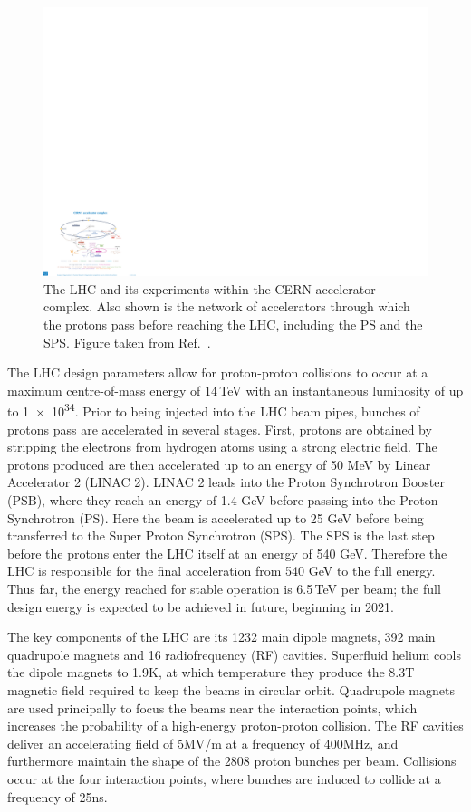 \begin{figure}[h!]
  \centering
  \includegraphics[width=\textwidth]{Figures/Detector/CERNschematic.pdf}
  \caption[The CERN accelerator complex.]
  {
    The LHC and its experiments within the CERN accelerator complex.
    Also shown is the network of accelerators through which the protons pass before reaching the LHC, 
    including the PS and the SPS.
    Figure taken from Ref.~\cite{CERNcomplex}.
  }
  \label{fig:detector_CERNschematic}
\end{figure}

The LHC design parameters allow for proton-proton collisions to occur at a maximum centre-of-mass energy of 14\,TeV 
with an instantaneous luminosity of up to \SI{1e34}{\lumi}.
Prior to being injected into the LHC beam pipes, bunches of protons pass are accelerated in several stages. 
First, protons are obtained by stripping the electrons from hydrogen atoms using a strong electric field.
The protons produced are then accelerated up to an energy of 50 MeV by Linear Accelerator 2 (LINAC 2).
LINAC 2 leads into the Proton Synchrotron Booster (PSB), where they reach an energy of 1.4 GeV before passing into the Proton Synchrotron (PS).
Here the beam is accelerated up to 25 GeV before being transferred to the Super Proton Synchrotron (SPS).
The SPS is the last step before the protons enter the LHC itself at an energy of 540 GeV.
Therefore the LHC is responsible for the final acceleration from 540 GeV to the full energy.
Thus far, the energy reached for stable operation is 6.5\,TeV per beam; 
the full design energy is expected to be achieved in future, beginning in 2021.

The key components of the LHC are its 1232 main dipole magnets, 392 main quadrupole magnets and 16 radiofrequency (RF) cavities.
Superfluid helium cools the dipole magnets to 1.9K, at which temperature they produce the 8.3T magnetic field required to keep the beams in circular orbit.
Quadrupole magnets are used principally to focus the beams near the interaction points, which increases the probability of a high-energy proton-proton collision.
The RF cavities deliver an accelerating field of 5MV/m at a frequency of 400MHz, and furthermore maintain the shape of the 2808 proton bunches per beam.
Collisions occur at the four interaction points, where bunches are induced to collide at a frequency of 25ns. 

